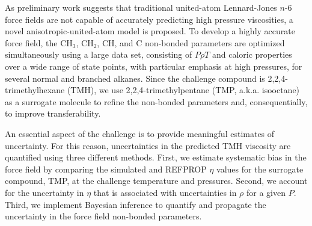 \documentclass[11pt,a4paper]{article}
\begin{document}
	As preliminary work suggests that traditional united-atom Lennard-Jones $n$-6 force fields are not capable of accurately predicting high pressure viscosities, a novel anisotropic-united-atom model is proposed. To develop a highly accurate force field, the CH$_3$, CH$_2$, CH, and C non-bonded parameters are optimized simultaneously using a large data set, consisting of $P\rho T$ and caloric properties over a wide range of state points, with particular emphasis at high pressures, for several normal and branched alkanes. Since the challenge compound is 2,2,4-trimethylhexane (TMH), we use 2,2,4-trimethylpentane (TMP, a.k.a. isooctane) as a surrogate molecule to refine the non-bonded parameters and, consequentially, to improve transferability. 
	
	
	
	
	
	
	An essential aspect of the challenge is to provide meaningful estimates of uncertainty. For this reason, uncertainties in the predicted TMH viscosity are quantified using three different methods. First, we estimate systematic bias in the force field by comparing the simulated and REFPROP $\eta$ values for the surrogate compound, TMP, at the challenge temperature and pressures. Second, we account for the uncertainty in $\eta$ that is associated with uncertainties in $\rho$ for a given $P$. Third, we implement Bayesian inference to quantify and propagate the uncertainty in the force field non-bonded parameters. 
	
\end{document}
